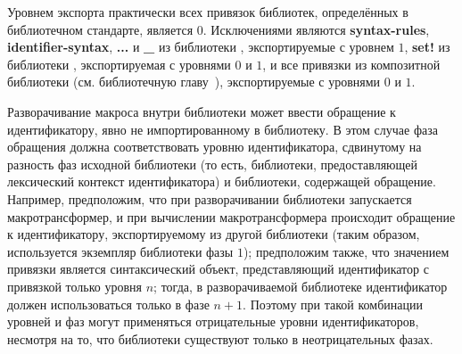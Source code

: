 Уровнем экспорта практически всех привязок библиотек, определённых в библиотечном стандарте,
является $0$. Исключениями являются {\cf\bfseries syntax-rules}, {\cf\bfseries
  identifier-syntax}, {\cf\bfseries ...} и {\cf\bfseries \_} из библиотеки
\textbf{}, экспортируемые с уровнем $1$, {\cf\bfseries set!} из библиотеки
\textbf{}, экспортируемая с уровнями $0$ и $1$, и все привязки из композитной
библиотеки \textbf{\thersixlibrary{}} (см. библиотечную
главу~), экспортируемые с уровнями $0$ и $1$.

Разворачивание макроса внутри библиотеки может ввести обращение к идентификатору, явно не
импортированному в библиотеку. В этом случае фаза обращения должна соответствовать уровню
идентификатора, сдвинутому на разность фаз исходной библиотеки (то есть, библиотеки,
предоставляющей лексический контекст идентификатора) и библиотеки, содержащей
обращение. Например, предположим, что при разворачивании библиотеки запускается
макротрансформер, и при вычислении макротрансформера происходит обращение к
идентификатору, экспортируемому из другой библиотеки (таким образом, используется экземпляр
библиотеки фазы $1$); предположим также, что значением привязки является синтаксический объект,
представляющий идентификатор с привязкой только уровня $n$; тогда, в разворачиваемой библиотеке
идентификатор должен использоваться только в фазе $n+1$. Поэтому при такой комбинации уровней и
фаз могут применяться отрицательные уровни идентификаторов, несмотря на то, что библиотеки
существуют только в неотрицательных фазах.

